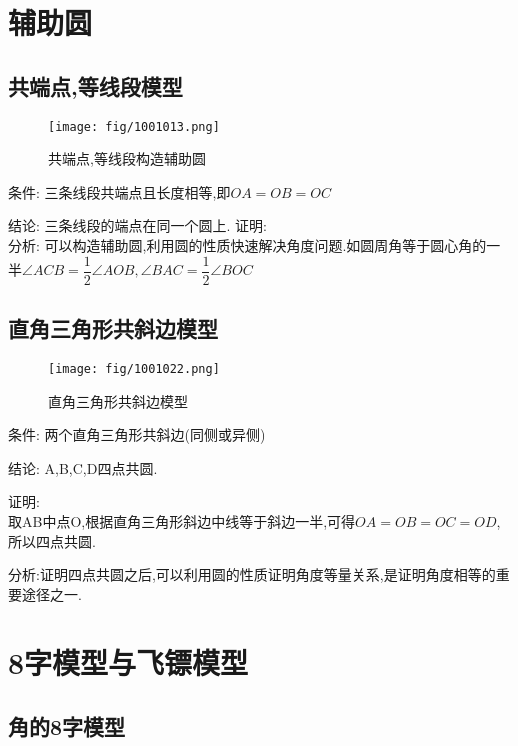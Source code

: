 \documentclass[cn,blue,10pt]{elegantbook}
\begin{document}
\section{辅助圆}%
\label{sec:辅助圆}
\subsection{共端点,等线段模型}%
\label{sub:共端点_等线段模型}

\begin{figure}[h]
    \centering
    \texttt{[image: fig/1001013.png]}
    \caption{共端点,等线段构造辅助圆}%
    \label{fig:倒数型相似}
\end{figure}
条件: 三条线段共端点且长度相等,即\(OA=OB=OC\) 

结论: 三条线段的端点在同一个圆上.
证明:\\

分析: 可以构造辅助圆,利用圆的性质快速解决角度问题.如圆周角等于圆心角的一半\(\angle ACB = \dfrac{1}{2}\angle AOB, \angle BAC = \dfrac{1}{2} \angle BOC\) 


\subsection{直角三角形共斜边模型}%
\label{sub:直角三角形共斜边模型}

\begin{figure}[h]
    \centering
    \texttt{[image: fig/1001022.png]}
    \caption{直角三角形共斜边模型}%
    \label{fig:倒数型相似}
\end{figure}
条件: 两个直角三角形共斜边(同侧或异侧) 

结论: A,B,C,D四点共圆. 

证明:\\
取AB中点O,根据直角三角形斜边中线等于斜边一半,可得\(OA=OB=OC=OD\),所以四点共圆.

分析:证明四点共圆之后,可以利用圆的性质证明角度等量关系,是证明角度相等的重要途径之一. 



\section{8字模型与飞镖模型}%
\label{sec:8字模型与飞镖模型}

\subsection{角的8字模型}%
\label{sub:角的8字模型}
\end{document}
